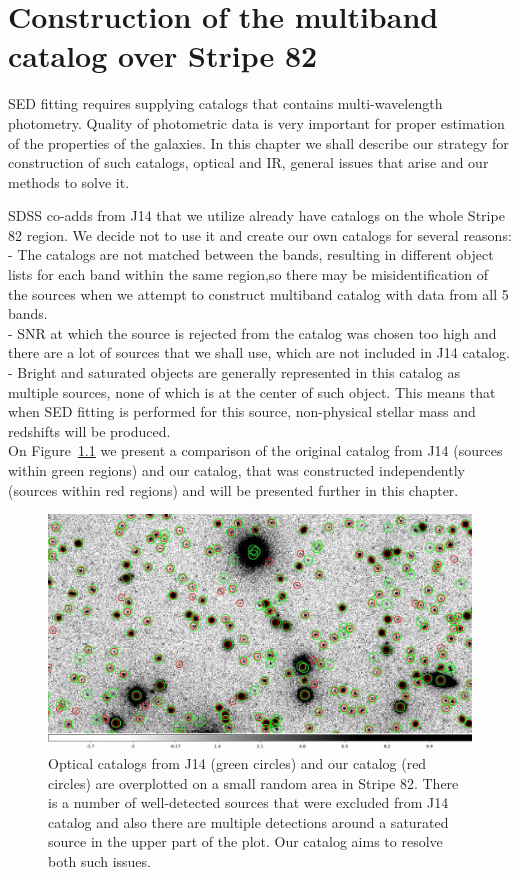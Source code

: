 \chapter{Construction of the multiband catalog over Stripe 82}\label{CH_02}

	SED fitting requires supplying catalogs that contains multi-wavelength photometry. Quality of photometric data is very important for proper estimation of the properties of the galaxies. In this chapter we shall describe our strategy for construction of such catalogs, optical and IR, general issues that arise and our methods to solve it.
	
	SDSS co-adds from J14 that we utilize already have catalogs on the whole Stripe 82 region. We decide not to use it and create our own catalogs for several reasons:\\
	-	The catalogs are not matched between the bands, resulting in different object lists for each band within the same region,so there may be misidentification of the sources when we attempt to construct multiband catalog with data from all 5 bands.\\
	-	SNR at which the source is rejected from the catalog was chosen too high and there are a lot of sources that we shall use, which are not included in J14 catalog.\\
	-	Bright and saturated objects are generally represented in this catalog as multiple sources, none of which is at the center of such object. This means that when SED fitting is performed for this source, non-physical stellar mass and redshifts will be produced. \\
	On Figure~\ref{fig:catalog_comp} we present a comparison of the original catalog from J14 (sources within green regions) and our catalog, that was constructed independently (sources within red regions) and will be presented further in this chapter.
	
\begin{figure}[!ht]
\includegraphics[width=6in]{Figures/catalog_comparison.jpeg}
\caption{Optical catalogs from J14 (green circles) and our catalog (red circles) are overplotted on a small random area in Stripe 82. There is a number of well-detected sources that were excluded from J14 catalog and also there are multiple detections around a saturated source in the upper part of the plot. Our catalog aims to resolve both such issues.}
\label{fig:catalog_comp}
\end{figure}	
	
